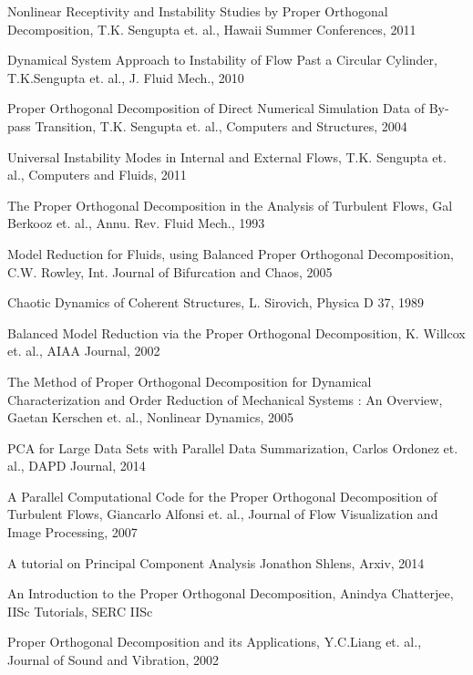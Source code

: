\documentclass[submit]{aiaa-tc_mod}%
\begin{document}
\clearpage
\begin{thebibliography}{20}%
 Nonlinear Receptivity and Instability Studies by Proper Orthogonal Decomposition, 
 T.K. Sengupta et. al., 
 Hawaii Summer Conferences, 
 2011
 
Dynamical System Approach to Instability of Flow Past a Circular Cylinder, 
T.K.Sengupta et. al., 
J. Fluid Mech., 
2010

Proper Orthogonal Decomposition of Direct Numerical Simulation Data of By-pass Transition, 
T.K. Sengupta et. al., 
Computers and Structures, 
2004

Universal Instability Modes in Internal and External Flows, 
T.K. Sengupta et. al., 
Computers and Fluids,
2011

The Proper Orthogonal Decomposition in the Analysis of Turbulent Flows, 
Gal Berkooz et. al.,
Annu. Rev. Fluid Mech., 
1993

Model Reduction for Fluids, using Balanced Proper Orthogonal Decomposition, 
C.W. Rowley, 
Int. Journal of Bifurcation and Chaos, 
2005

Chaotic Dynamics of Coherent Structures, 
L. Sirovich,
Physica D 37, 
1989

Balanced Model Reduction via the Proper Orthogonal Decomposition,
K. Willcox et. al., 
AIAA Journal,
2002

The Method of Proper Orthogonal Decomposition for Dynamical Characterization and Order Reduction of Mechanical Systems : An Overview,
Gaetan Kerschen et. al., 
Nonlinear Dynamics, 
2005


PCA for Large Data Sets with Parallel Data Summarization,
Carlos Ordonez et. al., 
DAPD Journal, 
2014

A Parallel Computational Code for the Proper Orthogonal Decomposition of Turbulent Flows,
Giancarlo Alfonsi et. al., 
Journal of Flow Visualization and Image Processing, 
2007

A tutorial on Principal Component Analysis
Jonathon Shlens, 
Arxiv, 
2014


An Introduction to the Proper Orthogonal Decomposition, 
Anindya Chatterjee, 
IISc Tutorials, 
SERC IISc

Proper Orthogonal Decomposition and its Applications,
Y.C.Liang et. al., 
Journal of Sound and Vibration, 
2002


\end{thebibliography}
\end{document}
